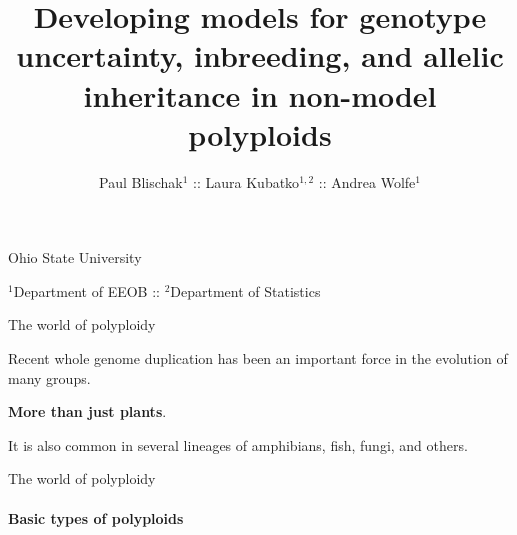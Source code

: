 \documentclass[presentation,sansserif]{beamer}
\title[Developing pop-gen models for polyploids]{Developing models for genotype uncertainty, inbreeding, and allelic inheritance in non-model polyploids}
\author[Blischak \textit{et al}.]{Paul Blischak$^1$ :: Laura Kubatko$^{1,2}$ :: Andrea Wolfe$^1$}
\date{}
\begin{document}
\beamertemplatenavigationsymbolsempty

\begin{frame}[plain]
	\vspace{-1.2in}
	\titlepage
	
	\vspace{-1.2in}
	\begin{center}
	
		{\footnotesize Ohio State University 	
		\vspace{0.05in}
		
		$^1$Department of EEOB :: $^2$Department of Statistics
		}		
	\end{center}
	\vspace{-0.2in}
		
\end{frame}


\begin{frame}[t]{The world of polyploidy}
  \vspace{0.3in}
  \pause
  
  Recent whole genome duplication has been an important force in the evolution of many groups.
  \vspace{0.3in}
  \pause
  
  \textbf{More than just plants}.
  \vspace{0.3in}
  \pause
    
  It is also common in several lineages of amphibians, fish, fungi, and others.

\end{frame}

\begin{frame}[t]{The world of polyploidy}
\framesubtitle{Basic types of polyploids}


	\begin{center}
	\end{center}
	
	
	\begin{center}
	\end{center}

\end{frame}
\end{document}
